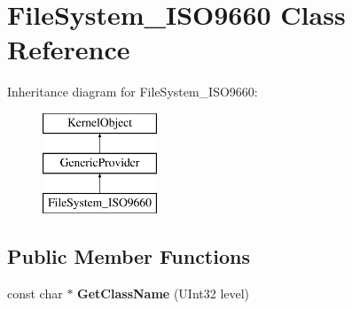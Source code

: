 \hypertarget{class_file_system___i_s_o9660}{}\section{File\+System\+\_\+\+I\+S\+O9660 Class Reference}
\label{class_file_system___i_s_o9660}
Inheritance diagram for File\+System\+\_\+\+I\+S\+O9660\+:\begin{figure}[H]
\begin{center}
\leavevmode
\includegraphics[height=3.000000cm]{class_file_system___i_s_o9660}
\end{center}
\end{figure}
\subsection*{Public Member Functions}
\begin{DoxyCompactItemize}
\item 
\mbox{\label{class_file_system___i_s_o9660_ae48eb790c8be9145a59730ea53a73667}} 
const char $\ast$ {\bfseries Get\+Class\+Name} (U\+Int32 level)
\end{DoxyCompactItemize}
